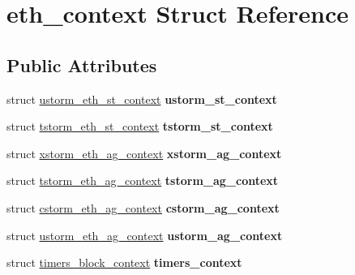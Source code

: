\hypertarget{structeth__context}{
\section{eth\_\-context Struct Reference}
\label{structeth__context}
}
\subsection*{Public Attributes}
\begin{DoxyCompactItemize}
\item 
\hypertarget{structeth__context_a6b7dd13b84751085bccb6fdc2e1d78e4}{
struct \hyperlink{structustorm__eth__st__context}{ustorm\_\-eth\_\-st\_\-context} {\bfseries ustorm\_\-st\_\-context}}
\label{structeth__context_a6b7dd13b84751085bccb6fdc2e1d78e4}

\item 
\hypertarget{structeth__context_afb4ae68e5fde65218c58d5b5f84beef6}{
struct \hyperlink{structtstorm__eth__st__context}{tstorm\_\-eth\_\-st\_\-context} {\bfseries tstorm\_\-st\_\-context}}
\label{structeth__context_afb4ae68e5fde65218c58d5b5f84beef6}

\item 
\hypertarget{structeth__context_a4c231169f14a5d7fc2512b9dbc4975c8}{
struct \hyperlink{structxstorm__eth__ag__context}{xstorm\_\-eth\_\-ag\_\-context} {\bfseries xstorm\_\-ag\_\-context}}
\label{structeth__context_a4c231169f14a5d7fc2512b9dbc4975c8}

\item 
\hypertarget{structeth__context_acb29b3f56e8dbefd3ff81b072caeeb33}{
struct \hyperlink{structtstorm__eth__ag__context}{tstorm\_\-eth\_\-ag\_\-context} {\bfseries tstorm\_\-ag\_\-context}}
\label{structeth__context_acb29b3f56e8dbefd3ff81b072caeeb33}

\item 
\hypertarget{structeth__context_a963bdab8b6f6dc7724f08f0e03029165}{
struct \hyperlink{structcstorm__eth__ag__context}{cstorm\_\-eth\_\-ag\_\-context} {\bfseries cstorm\_\-ag\_\-context}}
\label{structeth__context_a963bdab8b6f6dc7724f08f0e03029165}

\item 
\hypertarget{structeth__context_aa7b9d4913f53dd46b471ed09eca5ec71}{
struct \hyperlink{structustorm__eth__ag__context}{ustorm\_\-eth\_\-ag\_\-context} {\bfseries ustorm\_\-ag\_\-context}}
\label{structeth__context_aa7b9d4913f53dd46b471ed09eca5ec71}

\item 
\hypertarget{structeth__context_a4b8a416b08d352d0a0609b63525d3a8e}{
struct \hyperlink{structtimers__block__context}{timers\_\-block\_\-context} {\bfseries timers\_\-context}}
\label{structeth__context_a4b8a416b08d352d0a0609b63525d3a8e}


\end{DoxyCompactItemize}
